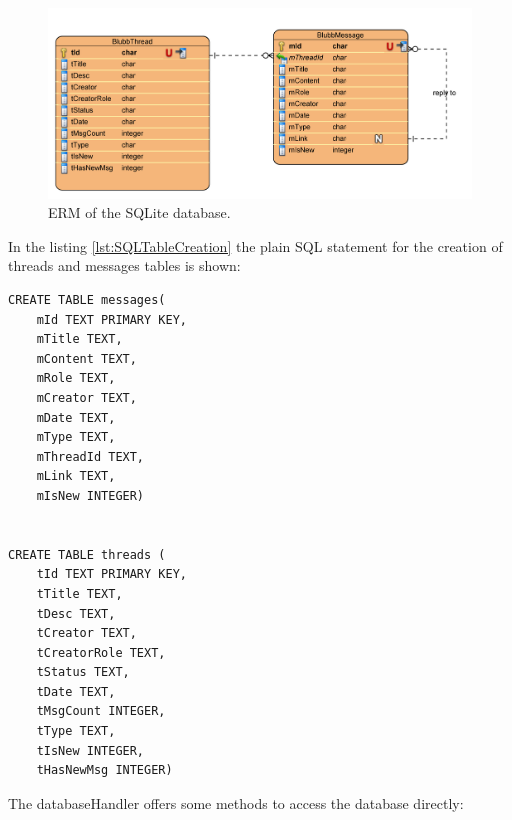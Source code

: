 \documentclass[12pt,a4paper,oneside]{report}
\begin{document}
\begin{figure}[!ht]
	\centering
    \includegraphics[width=\linewidth]{BlubbERM.png}
	\caption{ERM of the SQLite database.}
\end{figure}


In the listing \ref{lst:SQLTableCreation} the plain SQL statement for the creation of threads and messages tables is shown:
\lstset{language=SQL}
\begin{lstlisting}[caption=SQL code for creating the table messages, label=lst:SQLTableCreation]
CREATE TABLE messages(
	mId TEXT PRIMARY KEY,
	mTitle TEXT,
	mContent TEXT,
	mRole TEXT,
	mCreator TEXT,
	mDate TEXT,
	mType TEXT,
	mThreadId TEXT,
	mLink TEXT,
	mIsNew INTEGER)


CREATE TABLE threads (
	tId TEXT PRIMARY KEY,
	tTitle TEXT,
	tDesc TEXT,
	tCreator TEXT,
	tCreatorRole TEXT,
	tStatus TEXT,
	tDate TEXT, 
	tMsgCount INTEGER,
	tType TEXT,
	tIsNew INTEGER,
	tHasNewMsg INTEGER)
\end{lstlisting}
\lstset{language=Java}

The databaseHandler offers some methods to access the database directly:
\end{document}
